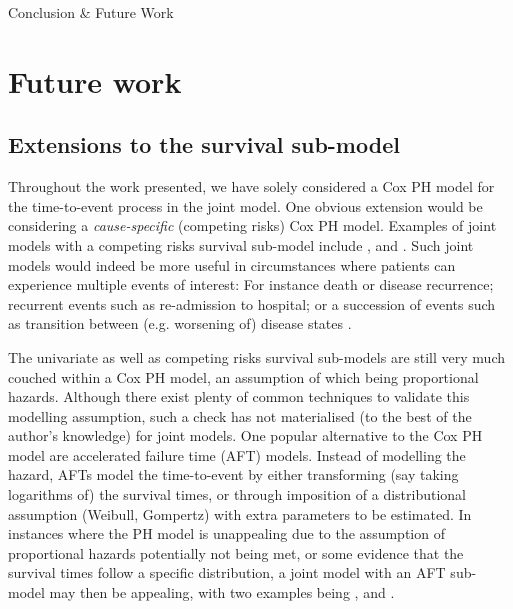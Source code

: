 \begin{chapter}{\label{cha:conclusion}Conclusion \& Future Work}
\section{Future work}
\subsection{Extensions to the survival sub-model}\label{sec:conclusion-future-survival}
Throughout the work presented, we have solely considered a Cox PH model for the time-to-event process in the joint model. One obvious extension would be considering a \textit{cause-specific} (\ie competing risks) Cox PH model. Examples of joint models with a competing risks survival sub-model include \citet{Williamson2008}, \citet{Li2010} and \citet{Rustand2023}. Such joint models would indeed be more useful in circumstances where patients can experience multiple events of interest: For instance death or disease recurrence; recurrent events such as re-admission to hospital; or a succession of events such as transition between (e.g. worsening of) disease states \citep{Hickey2018B}.

The univariate as well as competing risks survival sub-models are still very much couched within a Cox PH model, an assumption of which being proportional hazards. Although there exist plenty of common techniques to validate this modelling assumption, such a check has not materialised (to the best of the author's knowledge) for joint models. One popular alternative to the Cox PH model are accelerated failure time (AFT) models. Instead of modelling the hazard, AFTs model the time-to-event by either transforming (say taking logarithms of) the survival times, or through imposition of a distributional assumption (\eg Weibull, Gompertz) with extra parameters to be estimated. In instances where the PH model is unappealing due to the assumption of proportional hazards potentially not being met, or some evidence that the survival times follow a specific distribution, a joint model with an AFT sub-model may then be appealing, with two examples being \citet{Tseng2005}, and \citet{Khan2022}.


\end{chapter}
